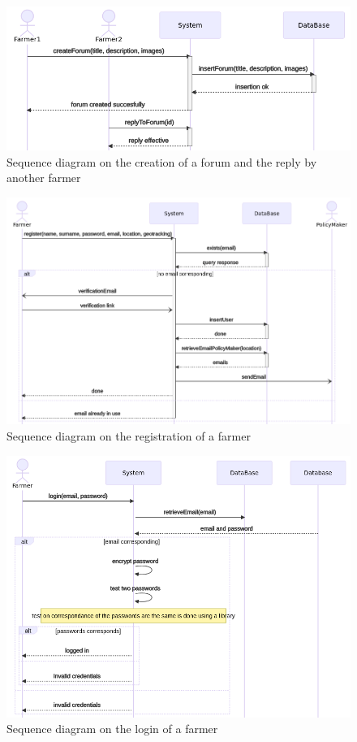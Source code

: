 \begin{figure}
	\centering
	\includegraphics[width=\textwidth]{Images/seq_creation_forum.png}
	\caption{\label{fig:seqcreationforum} Sequence diagram on the creation of a forum and the reply by another farmer}
\end{figure}

\begin{figure}
	\centering
	\includegraphics[width=\textwidth]{Images/seq_registration.png}
	\caption{\label{fig:seqregistration} Sequence diagram on the registration of a farmer}
\end{figure}

\begin{figure}
	\centering
	\includegraphics[width=\textwidth]{Images/seq_login.png}
	\caption{\label{fig:seqlogin} Sequence diagram on the login of a farmer}
\end{figure}

